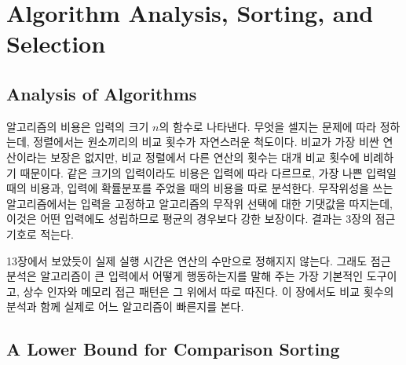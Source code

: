 \chapter{Algorithm Analysis, Sorting, and Selection}
\label{ch:sorting}


\section{Analysis of Algorithms}
\label{sec:analysis}

알고리즘의 비용은 입력의 크기 $n$의 함수로 나타낸다. 무엇을 셀지는 문제에 따라 정하는데, 정렬에서는 원소끼리의 비교 횟수가 자연스러운 척도이다. 비교가 가장 비싼 연산이라는 보장은 없지만, 비교 정렬에서 다른 연산의 횟수는 대개 비교 횟수에 비례하기 때문이다. 같은 크기의 입력이라도 비용은 입력에 따라 다르므로, 가장 나쁜 입력일 때의  비용과, 입력에 확률분포를 주었을 때의  비용을 따로 분석한다. 무작위성을 쓰는 알고리즘에서는 입력을 고정하고 알고리즘의 무작위 선택에 대한 기댓값을 따지는데, 이것은 어떤 입력에도 성립하므로 평균의 경우보다 강한 보장이다. 결과는 3장의 점근 기호로 적는다.

13장에서 보았듯이 실제 실행 시간은 연산의 수만으로 정해지지 않는다. 그래도 점근 분석은 알고리즘이 큰 입력에서 어떻게 행동하는지를 말해 주는 가장 기본적인 도구이고, 상수 인자와 메모리 접근 패턴은 그 위에서 따로 따진다. 이 장에서도 비교 횟수의 분석과 함께 실제로 어느 알고리즘이 빠른지를 본다.

\section{A Lower Bound for Comparison Sorting}
\label{sec:lower-bound}

